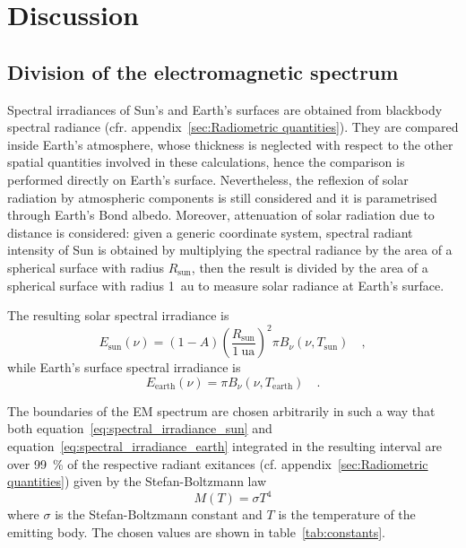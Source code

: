 \documentclass[a4paper,10pt,twocolumn,\classoptions]{article}
\begin{document}
\section{Discussion}



\subsection{Division of the electromagnetic spectrum}
\label{sec:Division of the electromagnetic spectrum}
Spectral irradiances of Sun's and Earth's surfaces are obtained from blackbody spectral radiance (cfr. appendix~\ref{sec:Radiometric quantities}). They are compared inside Earth's atmosphere, whose thickness is neglected with respect to the other spatial quantities involved in these calculations, hence the comparison is performed directly on Earth's surface. Nevertheless, the reflexion of solar radiation by atmospheric components is still considered and it is parametrised through Earth's Bond albedo. Moreover, attenuation of solar radiation due to distance is considered: given a generic coordinate system, spectral radiant intensity of Sun is obtained by multiplying the spectral radiance by the area of a spherical surface with radius $R_\text{sun}$, then the result is divided by the area of a spherical surface with radius \qty{1}{\astronomicalunit} to measure solar radiance at Earth's surface.

The resulting solar spectral irradiance is
\begin{equation}
  \label{eq:spectral_irradiance_sun}
  E_\text{sun}(\nu) = (1 - A) \left( \frac{R_\text{sun}}{\qty{1}{\astronomicalunit}} \right)^2 \pi B_\nu(\nu, T_\text{sun})
  \quad ,
\end{equation}
while Earth's surface spectral irradiance is
\begin{equation}
  \label{eq:spectral_irradiance_earth}
  E_\text{earth}(\nu) = \pi B_\nu(\nu, T_\text{earth})
  \quad .
\end{equation}

The boundaries of the EM spectrum are chosen arbitrarily in such a way that both equation~\eqref{eq:spectral_irradiance_sun} and equation~\eqref{eq:spectral_irradiance_earth} integrated in the resulting interval are over \qty{99}{\percent} of the respective radiant exitances (cf. appendix~\ref{sec:Radiometric quantities}) given by the Stefan-Boltzmann law
\begin{equation}
  \label{eq:stefan-boltzmann_law}
  M(T) = \sigma T^4
\end{equation}
where $\sigma$ is the Stefan-Boltzmann constant and $T$ is the temperature of the emitting body. The chosen values are shown in table~\ref{tab:constants}.
\end{document}
